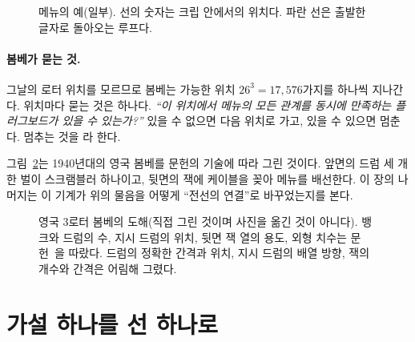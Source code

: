 \begin{figure}[ht]
\centering
{}
\caption{메뉴의 예(일부). 선의 숫자는 크립 안에서의 위치다. 파란 선은 출발한 글자로 돌아오는 루프다.}
\label{fig:g-menu}
\end{figure}

\paragraph{봄베가 묻는 것.} 그날의 로터 위치를 모르므로 봄베는 가능한 위치 $26^3 = 17{,}576$가지를 하나씩
지나간다. 위치마다 묻는 것은 하나다. \emph{``이 위치에서 메뉴의 모든 관계를 동시에 만족하는 플러그보드가 있을 수
있는가?''} 있을 수 없으면 다음 위치로 가고, 있을 수 있으면 멈춘다. 멈추는 것을 라 한다.

그림~\ref{fig:g-bombe-front}는 1940년대의 영국 봄베를 문헌의 기술에 따라 그린 것이다. 앞면의 드럼 세 개
한 벌이 스크램블러 하나이고, 뒷면의 잭에 케이블을 꽂아 메뉴를 배선한다. 이 장의 나머지는 이 기계가 위의 물음을
어떻게 ``전선의 연결''로 바꾸었는지를 본다.

\begin{figure}[p]
\centering

\caption{영국 3로터 봄베의 도해(직접 그린 것이며 사진을 옮긴 것이 아니다). 뱅크와 드럼의 수, 지시 드럼의
위치, 뒷면 잭 열의 용도, 외형 치수는 문헌~\cite{us6812report1944,ellsbury1998bombe,jackson-bh10}을
따랐다. 드럼의 정확한 간격과 위치, 지시 드럼의 배열 방향, 잭의 개수와 간격은 어림해 그렸다.}
\label{fig:g-bombe-front}
\end{figure}

\section{가설 하나를 선 하나로}\label{sec:c-wire}

